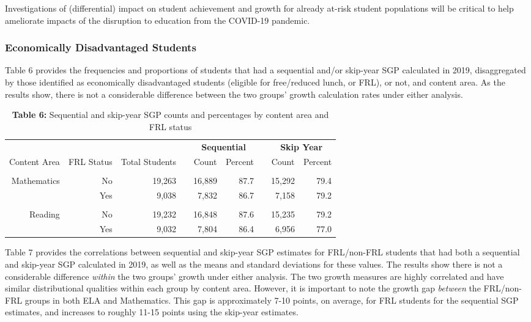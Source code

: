 \documentclass[12pt]{article}
\begin{document}
Investigations of (differential) impact on student achievement and
growth for already at-risk student populations will be critical to help
ameliorate impacts of the disruption to education from the COVID-19
pandemic.

\hypertarget{economically-disadvantaged-students}{%
\subsubsection{Economically Disadvantaged
Students}\label{economically-disadvantaged-students}}

Table 6 provides the frequencies and proportions of students that had a
sequential and/or skip-year SGP calculated in 2019, disaggregated by
those identified as economically disadvantaged students (eligible for
free/reduced lunch, or FRL), or not, and content area. As the results
show, there is not a considerable difference between the two groups'
growth calculation rates under either analysis.

\begin{table}[H]
\caption*{\textbf{Table 6:} Sequential and skip-year SGP counts and percentages by content area and FRL status\label{table6}} 
\begin{center}
\begin{tabular}{rrrcrrcrr}
\hline\hline
\multicolumn{3}{c}{\bfseries }&\multicolumn{1}{c}{\bfseries }&\multicolumn{2}{c}{\bfseries Sequential}&\multicolumn{1}{c}{\bfseries }&\multicolumn{2}{c}{\bfseries Skip Year}\tabularnewline
\cline{5-6} \cline{8-9}
\multicolumn{1}{c}{Content Area}&\multicolumn{1}{c}{FRL Status}&\multicolumn{1}{c}{Total Students}&\multicolumn{1}{c}{}&\multicolumn{1}{c}{Count}&\multicolumn{1}{c}{Percent}&\multicolumn{1}{c}{}&\multicolumn{1}{c}{Count}&\multicolumn{1}{c}{Percent}\tabularnewline
\hline
&&&&&&&&\tabularnewline
Mathematics&No&19,263&&16,889&87.7&&15,292&79.4\tabularnewline
&Yes&9,038&&7,832&86.7&&7,158&79.2\tabularnewline
\hline
&&&&&&&&\tabularnewline
Reading&No&19,232&&16,848&87.6&&15,235&79.2\tabularnewline
&Yes&9,032&&7,804&86.4&&6,956&77.0\tabularnewline
\hline
\end{tabular}\end{center}
\end{table}

Table 7 provides the correlations between sequential and skip-year SGP
estimates for FRL/non-FRL students that had both a sequential and
skip-year SGP calculated in 2019, as well as the means and standard
deviations for these values. The results show there is not a
considerable difference \emph{within} the two groups' growth under
either analysis. The two growth measures are highly correlated and have
similar distributional qualities within each group by content area.
However, it is important to note the growth gap \emph{between} the
FRL/non-FRL groups in both ELA and Mathematics. This gap is
approximately 7-10 points, on average, for FRL students for the
sequential SGP estimates, and increases to roughly 11-15 points using
the skip-year estimates.
\end{document}
